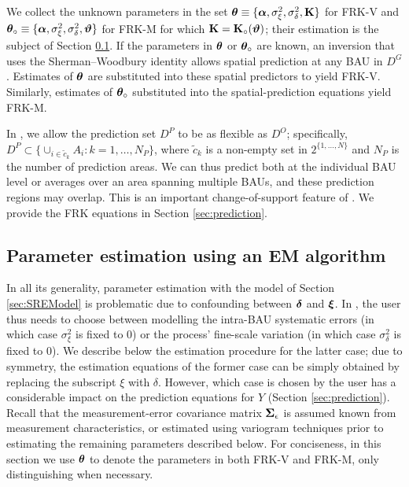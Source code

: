 We collect the unknown parameters in the set ${\boldsymbol{\theta}} \equiv \{{\boldsymbol{\alpha}}, \sigma^2_\xi, \sigma^2_\delta, \textbf{K}\}$ for FRK-V and ${\boldsymbol{\theta}}_\circ \equiv \{{\boldsymbol{\alpha}}, \sigma^2_\xi, \sigma^2_\delta, {\boldsymbol{\vartheta}}\}$ for FRK-M for which $\textbf{K} = \textbf{K}_\circ({\boldsymbol{\vartheta}})$; their estimation is the subject of Section \ref{sec:estimation}. If the parameters in ${\boldsymbol{\theta}}$ or ${\boldsymbol{\theta}}_\circ$ are known, an inversion that uses the Sherman--Woodbury identity \citep{Henderson_1981} allows spatial prediction at any BAU in $D^G$. Estimates of ${\boldsymbol{\theta}}$ are substituted into these spatial predictors to yield FRK-V. Similarly, estimates of ${\boldsymbol{\theta}}_\circ$ substituted into the spatial-prediction equations yield FRK-M.

In , we allow the prediction set $D^P$ to be as flexible as $D^O$; specifically, $D^P \subset \{ \cup_{i \in \tilde{c}_k} A_i : k = 1,\dots,N_P \}$, where $\tilde{c}_k$ is a non-empty set in $2^{\{1,\dots,N\}}$ and $N_P$ is the number of prediction areas. We can thus predict both at the individual BAU level or averages over an area spanning multiple BAUs, and these prediction regions may overlap. This is an important change-of-support feature of . We provide the FRK equations in Section \ref{sec:prediction}.

\subsection{Parameter estimation using an EM algorithm} \label{sec:estimation}

In all its generality, parameter estimation with the model of Section \ref{sec:SREModel} is problematic due to confounding between ${\boldsymbol{\delta}}$ and ${\boldsymbol{\xi}}$. In , the user thus needs to choose between modelling the intra-BAU systematic errors (in which case $\sigma^2_\xi$ is fixed to 0) or the process' fine-scale variation (in which case $\sigma^2_\delta$ is fixed to 0).
We describe below the estimation procedure for the latter case; due to symmetry, the estimation equations of the former case can be simply obtained by replacing the subscript $\xi$ with $\delta$. However, which case is chosen by the user has a considerable impact on the prediction equations for $Y$ (Section \ref{sec:prediction}). Recall that the measurement-error covariance matrix ${\bm \Sigma}_\epsilon$ is assumed known from measurement characteristics, or estimated using variogram techniques prior to estimating the remaining parameters described below. For conciseness, in this section we use ${\boldsymbol{\theta}}$ to denote the parameters in both FRK-V and FRK-M, only distinguishing when necessary.

